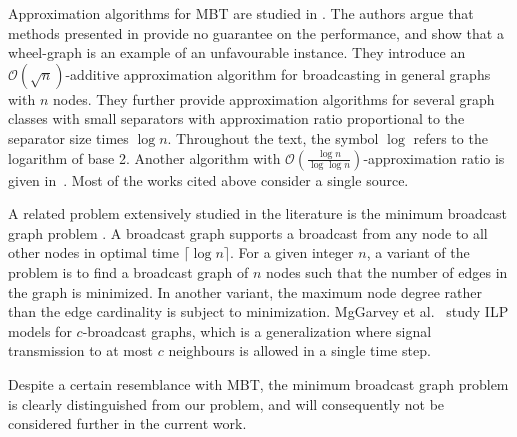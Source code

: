 Approximation algorithms for MBT are studied in \cite{kortsarz95}. 
The authors argue that methods presented in \cite{scheuermann84} provide no guarantee on the performance, and show that a wheel-graph is an example of an unfavourable instance.
They introduce an $\mathcal{O}(\sqrt{n})$-additive approximation algorithm for broadcasting in general graphs with $n$ nodes.
They further provide approximation algorithms for several graph classes with small separators with approximation ratio proportional to the separator size times $\log n$.
Throughout the text, the symbol $\log$ refers to the logarithm of base 2.
Another algorithm with $\mathcal{O}\left(\frac{\log n}{\log \log n}\right)$-approximation ratio is given in~\cite{elkin03}.
Most of the works cited above consider a single source.

A related problem extensively studied in the literature is the minimum broadcast graph problem \cite{grigni91,mcgarvey16}. 
A broadcast graph supports a broadcast from any node to all other nodes in optimal time $\lceil\log n\rceil$.
For a given integer $n$, a variant of the problem is to find a broadcast graph of $n$ nodes such that the number of edges in the graph is minimized.
In another variant, the maximum node degree rather than the edge cardinality is subject to minimization.
MgGarvey et al.\ \cite{mcgarvey16} study ILP models for $c$-broadcast graphs, which is a generalization where signal transmission to at most $c$ neighbours is allowed in a single time step.

Despite a certain resemblance with MBT, the minimum broadcast graph problem is clearly distinguished from our problem,
and will consequently not be considered further in the current work.
